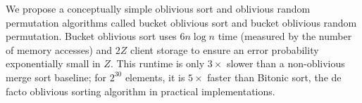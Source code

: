 We propose a conceptually simple oblivious sort and oblivious random permutation algorithms called bucket oblivious sort and bucket oblivious random permutation.
Bucket oblivious sort uses $6n\log n$ time (measured by the number of memory accesses) and $2Z$ client storage to ensure an error probability exponentially small in $Z$. 
This runtime is only $3\times$ slower than a non-oblivious merge sort baseline;
for $2^{30}$ elements, it is $5\times$ faster than Bitonic sort,
the de facto oblivious sorting algorithm in practical implementations. 


